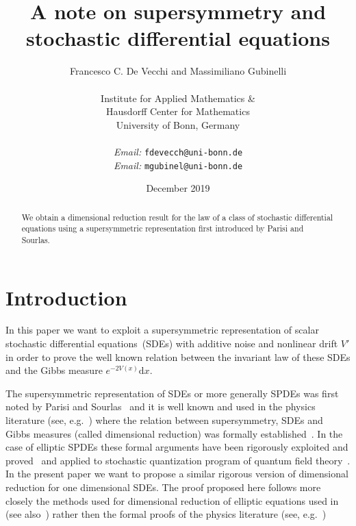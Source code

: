 \documentclass[a4paper,10pt]{article}
\newcommand{\mathd}{\mathrm{d}}
\newcommand{\tmaffiliation}[1]{\\ #1}
\newcommand{\tmemail}[1]{\\ \textit{Email:} \texttt{#1}}
\begin{document}
\title{
  A note on supersymmetry and  stochastic differential equations
}

\author{Francesco C. De Vecchi and Massimiliano Gubinelli\\
  \tmaffiliation{
  Institute for Applied Mathematics \&\\
  Hausdorff Center for Mathematics\\
  University of Bonn, Germany}\\
  \tmemail{fdevecch@uni-bonn.de}
  \tmemail{mgubinel@uni-bonn.de}
}

\date{December 2019}

\maketitle

\begin{abstract}
  We obtain a dimensional reduction result for the law of a class of
  stochastic differential equations using a supersymmetric representation
  first introduced by Parisi and Sourlas.
\end{abstract}

\section{Introduction}

In this paper we want to exploit a supersymmetric representation of scalar
stochastic differential equations~(SDEs) with additive noise and nonlinear
drift $V'$ in order to prove the well known relation between the invariant law
of these SDEs and the Gibbs measure $e^{- 2 V (x)} \mathd x$.

The supersymmetric representation of SDEs or more generally SPDEs was first
noted by Parisi and
Sourlas~{\cite{parisi_random_1979,parisi_supersymmetric_1982}} and it is well
known and used in the physics literature (see, e.g.~{\cite{Zinn1993}}) where
the relation between supersymmetry, SDEs and Gibbs measures (called
dimensional reduction) was formally
established~{\cite{damgaard_stochastic_1988,Gozzi1984}}. In the case of
elliptic SPDEs these formal arguments have been rigorously exploited and
proved~{\cite{albeverio_elliptic_2018,Klein1984}} and applied to stochastic
quantization program of quantum field theory~{\cite{AlDeGu2019,GuHof2019}}. In
the present paper we want to propose a similar rigorous version of dimensional
reduction for one dimensional SDEs. The proof proposed here follows more
closely the methods used for dimensional reduction of elliptic equations used
in~{\cite{albeverio_elliptic_2018}} (see also~{\cite{Klein1984}}) rather then
the formal proofs of the physics literature (see,
e.g.~{\cite{damgaard_stochastic_1988,Gozzi1984}})
\end{document}
